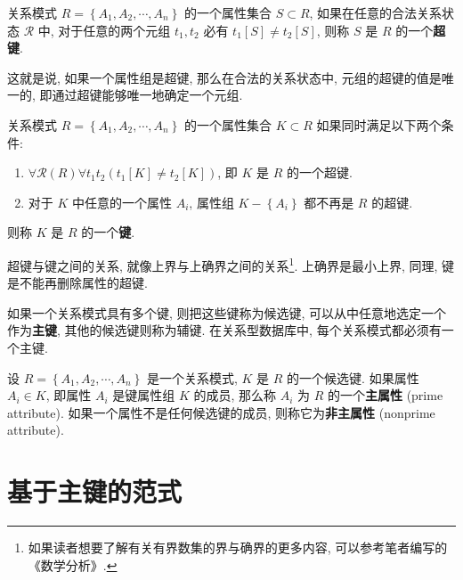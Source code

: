 \documentclass[10pt,UTF8]{book} %
\begin{document}
\begin{definition}
    关系模式 $R = \left\{A_1, A_2, \cdots, A_n \right\}$ 的一个属性集合
    $S \subset R$, 如果在任意的合法关系状态 $\mathcal{R}$ 中,
    对于任意的两个元组 $t_1, t_2$ 必有 $t_1[S] \ne t_2[S]$,
    则称 $S$ 是 $R$ 的一个\textbf{超键}.
\end{definition}

这就是说, 如果一个属性组是超键, 那么在合法的关系状态中, 元组的超键的值是唯一的,
即通过超键能够唯一地确定一个元组.

\begin{definition}
    关系模式 $R = \left\{ A_1, A_2, \cdots, A_n \right\}$
    的一个属性集合 $K \subset R$ 如果同时满足以下两个条件:
    \begin{enumerate}[label={${\arabic*}^\circ$}, itemsep=0pt]
        \item $\forall \mathcal{R}(R) \forall t_1 t_2 \left(
            t_1[K] \ne t_2[K]
        \right)$, 即 $K$ 是 $R$ 的一个超键.
        \item 对于 $K$ 中任意的一个属性 $A_i$, 属性组
        $K - \left\{ A_i \right\}$ 都不再是 $R$ 的超键.
    \end{enumerate}
    则称 $K$ 是 $R$ 的一个\textbf{键}.
\end{definition}

超键与键之间的关系, 就像上界与上确界之间的关系\footnote{
    如果读者想要了解有关有界数集的界与确界的更多内容,
    可以参考笔者编写的《数学分析》.
}. 上确界是最小上界,
同理, 键是不能再删除属性的超键.

如果一个关系模式具有多个键, 则把这些键称为候选键, 可以从中任意地选定一个作为\textbf{主键},
其他的候选键则称为辅键. 在关系型数据库中, 每个关系模式都必须有一个主键.

\begin{definition}[主属性]
    设 $R = \left\{A_1, A_2, \cdots, A_n\right\}$ 是一个关系模式,
    $K$ 是 $R$ 的一个候选键. 如果属性 $A_i \in K$, 即属性 $A_i$ 是键属性组
    $K$ 的成员, 那么称 $A_i$ 为 $R$ 的一个\textbf{主属性} (prime attribute).
    如果一个属性不是任何候选键的成员, 则称它为\textbf{非主属性} (nonprime attribute).
\end{definition}

\section{基于主键的范式}
\end{document}
